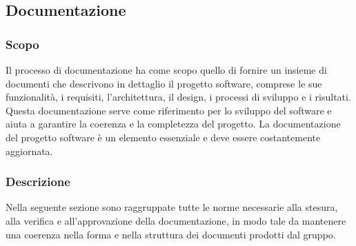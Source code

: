 \subsection{Documentazione}
\subsubsection{Scopo}
Il processo di documentazione ha come scopo quello di fornire un insieme di documenti che descrivono in dettaglio il progetto software, comprese le sue funzionalità, i requisiti, l'architettura, il design, i processi di sviluppo e i risultati. 
Questa documentazione serve come riferimento per lo sviluppo del software e aiuta a garantire la coerenza e la completezza del progetto. 
La documentazione del progetto software è un elemento essenziale e deve essere costantemente aggiornata.
\subsubsection{Descrizione}
Nella seguente sezione sono raggruppate tutte le norme necessarie alla stesura, alla verifica e 
all’approvazione della documentazione, in modo tale da mantenere una coerenza nella forma e nella 
struttura dei documenti prodotti dal gruppo.








